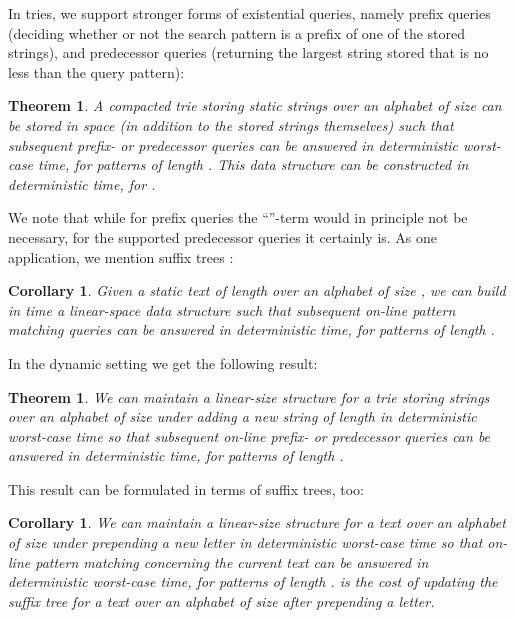 \documentclass[11pt,onecolumn,final]{article} \usepackage{a4}
\theoremstyle{plain}
\newtheorem{theorem}[definition]{Theorem}
\newtheorem{corollary}[definition]{Corollary}
\theoremstyle{remark}
\begin{document}
In tries, we support stronger forms of existential queries, namely prefix queries (deciding whether or not the search pattern is a prefix of one of the stored strings), and predecessor queries (returning the largest string stored that is no less than the query pattern):

\begin{theorem}
  \label{thm:main}
  A compacted trie storing  static strings over an alphabet of size  can be stored in  space (in addition to the stored strings themselves) such that subsequent prefix- or predecessor queries can be answered in  deterministic worst-case time, for patterns of length . This data structure can be constructed in deterministic  time, for .
\end{theorem}

We note that while for prefix queries the ``''-term would in principle not be necessary, for the supported predecessor queries it certainly is. As one application, we mention suffix trees \cite{weiner73linear}:

\begin{corollary}
  \label{cor:main}
  Given a static text of length  over an alphabet of size , we can build in  time a linear-space data structure such that subsequent on-line pattern matching queries can be answered in  deterministic time, for patterns of length .
\end{corollary}

In the dynamic setting we get the following result:

\begin{theorem}
\label{thm:main2}
  We can maintain a linear-size structure for a trie storing strings over an alphabet of size  under adding a new string of length  in deterministic worst-case time  so that subsequent on-line prefix- or predecessor queries can be answered in  deterministic time, for patterns of length .
\end{theorem}

This result can be formulated in terms of suffix trees, too:

\begin{corollary}
  \label{cor:main2}
  We can maintain a linear-size structure for a text over an alphabet of size  under prepending a new letter in deterministic worst-case time  so that on-line pattern matching concerning the current text can be answered in  deterministic worst-case time, for patterns of length .  is the cost of updating the suffix tree for a text  over an alphabet of size  after prepending a letter.
\end{corollary}
\end{document}
